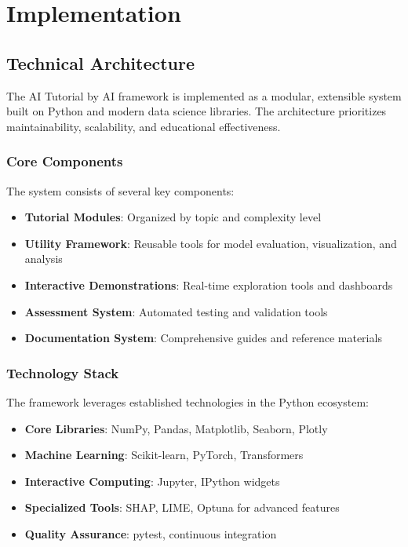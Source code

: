 \section{Implementation}
\label{sec:implementation}

\subsection{Technical Architecture}

The AI Tutorial by AI framework is implemented as a modular, extensible system built on Python and modern data science libraries. The architecture prioritizes maintainability, scalability, and educational effectiveness.

\subsubsection{Core Components}

The system consists of several key components:

\begin{itemize}
    \item \textbf{Tutorial Modules}: Organized by topic and complexity level
    \item \textbf{Utility Framework}: Reusable tools for model evaluation, visualization, and analysis
    \item \textbf{Interactive Demonstrations}: Real-time exploration tools and dashboards
    \item \textbf{Assessment System}: Automated testing and validation tools
    \item \textbf{Documentation System}: Comprehensive guides and reference materials
\end{itemize}

\subsubsection{Technology Stack}

The framework leverages established technologies in the Python ecosystem:

\begin{itemize}
    \item \textbf{Core Libraries}: NumPy, Pandas, Matplotlib, Seaborn, Plotly
    \item \textbf{Machine Learning}: Scikit-learn, PyTorch, Transformers
    \item \textbf{Interactive Computing}: Jupyter, IPython widgets
    \item \textbf{Specialized Tools}: SHAP, LIME, Optuna for advanced features
    \item \textbf{Quality Assurance}: pytest, continuous integration
\end{itemize}

